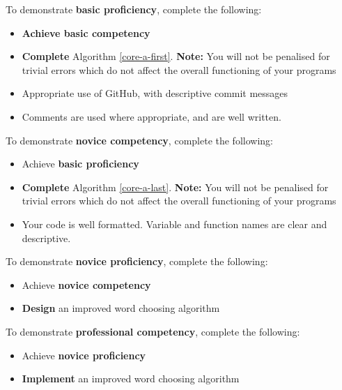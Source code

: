 \documentclass{../../../fal_assignment}
\begin{document}
To demonstrate \textbf{basic proficiency}, complete the following:
\begin{itemize}
	\item \textbf{Achieve basic competency}
	\item \textbf{Complete} Algorithm \ref{core-a-first}. \textbf{Note:} You will not be penalised for trivial errors which do not
	affect the overall functioning of your programs
	\item Appropriate use of GitHub, with descriptive commit messages 
	\item Comments are used where appropriate, and are well written.
\end{itemize}

To demonstrate \textbf{novice competency}, complete the following:
\begin{itemize}
	\item Achieve \textbf{basic proficiency}
	\item \textbf{Complete} Algorithm \ref{core-a-last}. \textbf{Note:} You will not be penalised for trivial errors which do not
affect the overall functioning of your programs
	\item Your code is well formatted. Variable and function names are clear and descriptive.
\end{itemize}

To demonstrate \textbf{novice proficiency}, complete the following:
\begin{itemize}
	\item Achieve \textbf{novice competency}
	\item \textbf{Design} an improved word choosing algorithm 
\end{itemize}

To demonstrate \textbf{professional competency}, complete the following:
\begin{itemize}
	\item Achieve \textbf{novice proficiency}
	\item \textbf{Implement} an improved word choosing algorithm 
\end{itemize}
\end{document}
